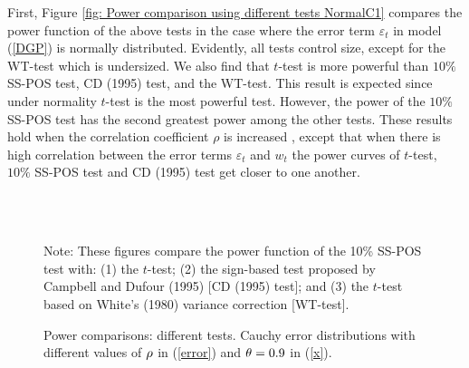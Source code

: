 \documentclass[harvard,11pt]{article}
\begin{document}
First, Figure \ref{fig: Power comparison using different tests NormalC1}
compares the power function of the above tests in the case where the error
term $\varepsilon _{t}$ in model (\ref{DGP}) is normally distributed.
Evidently, all tests control size, except for the WT-test which is
undersized. We also find that $t$-test is more powerful than $10\%$ SS-POS
test, CD (1995) test, and the WT-test\textit{.} This result is expected since under
normality $t$-test is the most powerful test. However, the power of the $10\%$
SS-POS test has the second greatest power among the other tests. These results
hold when the correlation coefficient $\rho $ is increased ,
except that when there is high correlation between the error terms $\varepsilon
_{t}$ and $w_{t}$ the power curves of $t$-test, $10\%$ SS-POS test and CD (1995)
test get closer to one another. 
\begin{figure}[tbph]
\caption{Power comparisons: different tests. Cauchy error distributions with
different values of $\protect\rho $ in (\protect\ref{error}) and $\protect%
\theta =0.9$ in (\protect\ref{x}).}
\begin{center}
 \\[0pt]
\\[0pt]
\end{center}

Note: These figures compare the power
function of the 10\% SS-POS test with: (1) the $t$-test; (2) the sign-based test
proposed by Campbell and Dufour (1995) [CD (1995) test]; and (3) the $t$-test based
on White's (1980) variance correction [WT-test]. 
\label{fig: Power comparaison using different tests CauchyC1}
\end{figure}
\end{document}
